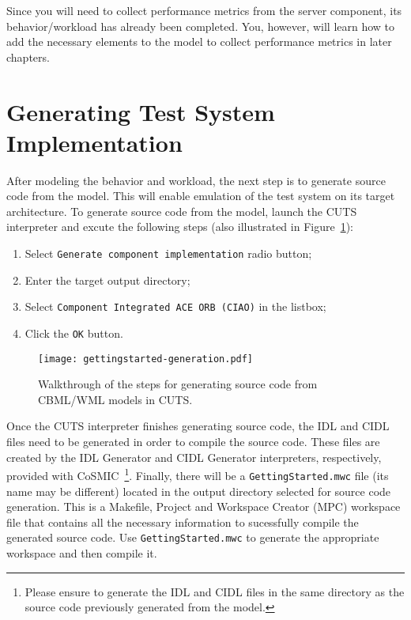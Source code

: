 Since you will need to collect performance metrics from the server
component, its behavior/workload has already been completed. You,
however, will learn how to add the necessary elements to the model
to collect performance metrics in later chapters.

\section{Generating Test System Implementation}
\label{sec:quickstart-generation}

After modeling the behavior and workload, the next step is to 
generate source code from the model. This will enable emulation 
of the test system on its target architecture. To generate source 
code from the model, launch the CUTS interpreter and excute the 
following steps (also illustrated in Figure~\ref{fig:gettingstarted-generation}):
\begin{enumerate}
  \item Select \texttt{Generate component implementation} radio button;
  \item Enter the target output directory;
  \item Select \texttt{Component Integrated ACE ORB (CIAO)} in the listbox;
  \item Click the \texttt{OK} button.
\end{enumerate}
\begin{figure}[htbp]
  \centering
  \texttt{[image: gettingstarted-generation.pdf]}
  \caption{Walkthrough of the steps for generating source code from
  CBML/WML models in CUTS.}
  \label{fig:gettingstarted-generation}
\end{figure}

Once the CUTS interpreter finishes generating source code, the IDL and CIDL 
files need to be generated in order to compile the source code. These files 
are created by the IDL Generator and CIDL Generator interpreters, respectively, 
provided with CoSMIC~\footnote{Please ensure to generate the IDL and CIDL 
files in the same directory as the source code previously generated 
from the model.}. Finally, there will be a \texttt{GettingStarted.mwc} 
file (its name may be different) located in the output directory selected 
for source code generation. This is a Makefile, Project and Workspace Creator 
(MPC) workspace file that contains all the necessary information to sucessfully 
compile the generated source code. Use \texttt{GettingStarted.mwc} to generate 
the appropriate workspace and then compile it.

